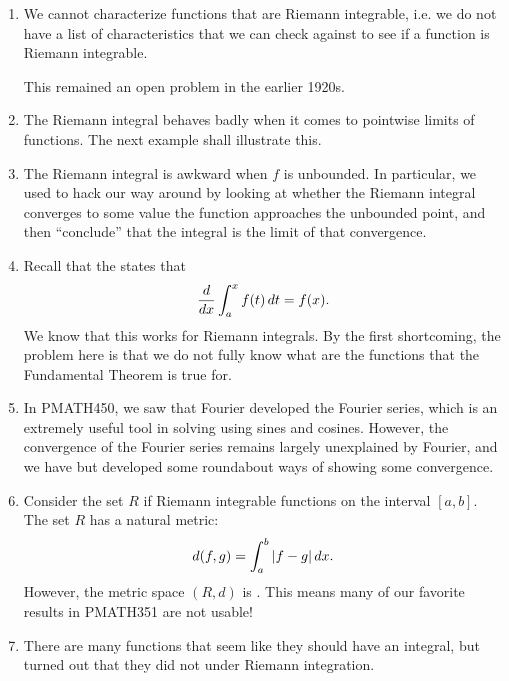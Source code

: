 \documentclass[notoc,notitlepage]{tufte-book}
\begin{document}
\begin{note}
  \begin{enumerate}
    \item We cannot characterize functions that are Riemann integrable,
      i.e. we do not have a list of characteristics that we can check
      against to see if a function is Riemann integrable.

      This remained an open problem in the earlier 1920s.
    \item The Riemann integral behaves badly when it comes to
      pointwise limits of functions. The next example shall illustrate
      this.
    \item The Riemann integral is awkward when $f$ is unbounded.
      In particular, we used to hack our way around by looking at
      whether the Riemann integral converges to some value the function
      approaches the unbounded point, and then ``conclude''
      that the integral is the limit of that convergence.
    \item Recall that the  states
      that
      \begin{equation*}
        \frac{\mathop{}\!d{}}{\mathop{}\!d{x}} \int_{a}^{x} f(t) \mathop{}\!d{t} = f(x).
      \end{equation*}
      We know that this works for Riemann integrals.
      By the first shortcoming, the problem here is that we do not
      fully know what are the functions that the Fundamental Theorem
      is true for.
    \item In PMATH450, we saw that Fourier developed the Fourier series,
      which is an extremely useful tool
      in solving  using sines and cosines.
      However, the convergence of the Fourier series remains largely
      unexplained by Fourier, and we have but developed
      some roundabout ways of showing some convergence.
    \item Consider the set $R$ if Riemann integrable functions
      on the interval $[a, b]$.
      The set $R$ has a natural metric:
      \begin{equation*}
        d(f, g) = \int_{a}^{b} \left|f - g\right| \mathop{}\!d{x}.
      \end{equation*}
      However, the metric space $(R, d)$ is .
      This means many of our favorite results in PMATH351 are not usable!
    \item There are many functions that seem like they should have
      an integral, but turned out that they did not under Riemann integration.
  \end{enumerate}
\end{note}
\end{document}
